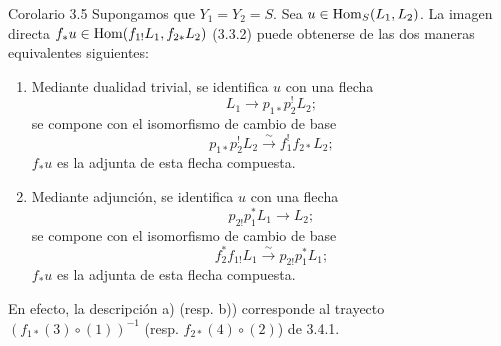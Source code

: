 \begin{statement}{Corolario 3.5}
Supongamos que $Y_1=Y_2=S$. Sea $u\in\operatorname{Hom}_S(L_1,L_2)$. La imagen directa $f_*u\in\operatorname{Hom}(f_{1!}L_1,f_{2*}L_2)$ (3.3.2) puede obtenerse de las dos maneras equivalentes siguientes:
\end{statement}
\begin{enumerate}[label=\alph*)]
\item Mediante dualidad trivial, se identifica $u$ con una flecha
\[
L_1\longrightarrow p_{1*}p_2^!L_2;
\]
se compone con el isomorfismo de cambio de base
\[
p_{1*}p_2^!L_2\xrightarrow{\sim}f_1^!f_{2*}L_2;
\]
$f_*u$ es la adjunta de esta flecha compuesta.
\item Mediante adjunción, se identifica $u$ con una flecha
\[
p_{2!}p_1^*L_1\longrightarrow L_2;
\]
se compone con el isomorfismo de cambio de base
\[
f_2^*f_{1!}L_1\xrightarrow{\sim}p_{2!}p_1^*L_1;
\]
$f_*u$ es la adjunta de esta flecha compuesta.
\end{enumerate}
En efecto, la descripción a) (resp. b)) corresponde al trayecto $(f_{1*}(3)\circ(1))^{-1}$ (resp. $f_{2*}(4)\circ(2)$) de 3.4.1.
